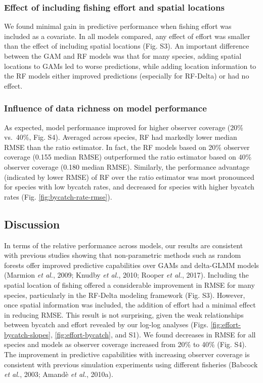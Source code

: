 \documentclass[]{article}
\begin{document}
\subsubsection{Effect of including fishing effort and spatial
locations}\label{effect-of-including-fishing-effort-and-spatial-locations}

We found minimal gain in predictive performance when fishing effort was
included as a covariate. In all models compared, any effect of effort
was smaller than the effect of including spatial locations (Fig. S3). An
important difference between the GAM and RF models was that for many
species, adding spatial locations to GAMs led to worse predictions,
while adding location information to the RF models either improved
predictions (especially for RF-Delta) or had no effect.

\subsubsection{Influence of data richness on model
performance}\label{influence-of-data-richness-on-model-performance}

As expected, model performance improved for higher observer coverage
(20\% vs.~40\%, Fig. S4). Averaged across species, RF had markedly lower
median RMSE than the ratio estimator. In fact, the RF models based on
20\% observer coverage (0.155 median RMSE) outperformed the ratio
estimator based on 40\% observer coverage (0.180 median RMSE).
Similarly, the performance advantage (indicated by lower RMSE) of RF
over the ratio estimator was most pronounced for species with low
bycatch rates, and decreased for species with higher bycatch rates (Fig.
\ref{fig:bycatch-rate-rmse}).

\subsection{Discussion}\label{discussion}

In terms of the relative performance across models, our results are
consistent with previous studies showing that non-parametric methods
such as random forests offer improved predictive capabilities over GAMs
and delta-GLMM models (Marmion \emph{et al.}, 2009; Knudby \emph{et
al.}, 2010; Rooper \emph{et al.}, 2017). Including the spatial location
of fishing offered a considerable improvement in RMSE for many species,
particularly in the RF-Delta modeling framework (Fig. S3). However, once
spatial information was included, the addition of effort had a minimal
effect in reducing RMSE. This result is not surprising, given the weak
relationships between bycatch and effort revealed by our log-log
analyses (Figs. \ref{fig:effort-bycatch-slopes},
\ref{fig:effort-bycatch}, and S1). We found decreases in RMSE for all
species and models as observer coverage increased from 20\% to 40\%
(Fig. S4). The improvement in predictive capabilities with increasing
observer coverage is consistent with previous simulation experiments
using different fisheries (Babcock \emph{et al.}, 2003; Amandè \emph{et
al.}, 2010a).
\end{document}
